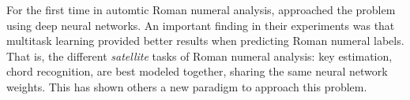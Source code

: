 

For the first time in automtic Roman numeral analysis,
\textcite{chen2018functional} approached the problem using
deep neural networks. An important finding in their experiments was that multitask learning \cite{ruder2017overview} provided better results when predicting Roman numeral labels. That is, the different \emph{satellite} tasks of Roman numeral analysis: key estimation, chord recognition, are best modeled together, sharing the same neural network weights. This has shown others a new paradigm to approach this problem.
